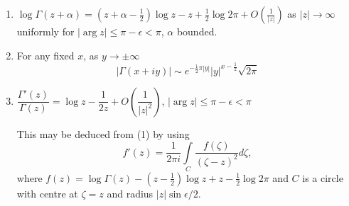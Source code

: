 \begin{corollaries*}
\begin{enumerate}
\renewcommand{\labelenumi}{(\theenumi)}
\item $\log \Gamma (z+\alpha) = \left(z+\alpha -\frac{1}{2}\right) \log z - z +
\frac{1}{2}  \log 2 \pi + O \left(\frac{1}{|z|} \right)$ as $|z| \to
  \infty$\pageoriginale uniformly for $|\arg z| \leq \pi - \epsilon
  < \pi$, $\alpha$ bounded.

\item For any fixed $x$, as $y \to \pm \infty$
$$
|\Gamma (x+iy)| \sim e^{-\frac{1}{2} \pi |y|} |y|^{x -\frac{1}{2}}
\sqrt{2\pi} 
$$

\item $\dfrac{\Gamma'(z)}{\Gamma(z)} = \log z -\dfrac{1}{2z} + O
  \left(\dfrac{1}{|z|^2} \right)$, $|\arg z| \leq \pi - \epsilon <
  \pi$ \cite[p.57]{key11}

This may be deduced from (1) by using 
$$
f'(z) = \frac{1}{2\pi  i } \int\limits_C \frac{f(\zeta)}{(\zeta -z)^2}
d \zeta, 
$$
where $f(z) = \log \Gamma (z) - \left(z-\frac{1}{2} \right) \log z + z
- \frac{1}{2} \log 2 \pi$ and $C$ is a circle with centre at $\zeta =
z$ and radius $|z|\sin\epsilon/2$.
\end{enumerate}
\end{corollaries*}
